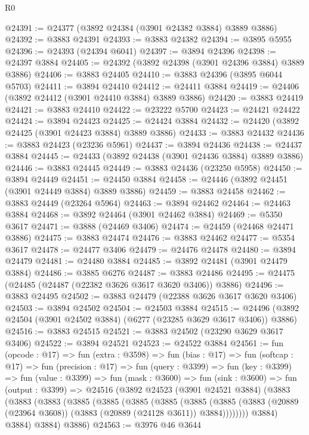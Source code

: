\begin{lexlean}{R0}
\begin{coremodule}
@24391 := @24377 (@3892 @24384 (@3901 @24382 @3884) @3889 @3886)
@24392 := @3883 @24391
@24393 := @3883 @24382
@24394 := @3895 @5955
@24396 := @24393 (@24394 @6041)
@24397 := @3894 @24396
@24398 := @24397 @3884
@24405 := @24392 (@3892 @24398 (@3901 @24396 @3884) @3889 @3886)
@24406 := @3883 @24405
@24410 := @3883 @24396 (@3895 @6044 @5703)
@24411 := @3894 @24410
@24412 := @24411 @3884
@24419 := @24406 (@3892 @24412 (@3901 @24410 @3884) @3889 @3886)
@24420 := @3883 @24419
@24421 := @3883 @24410
@24422 := @23222 @5700
@24423 := @24421 @24422
@24424 := @3894 @24423
@24425 := @24424 @3884
@24432 := @24420 (@3892 @24425 (@3901 @24423 @3884) @3889 @3886)
@24433 := @3883 @24432
@24436 := @3883 @24423 (@23236 @5961)
@24437 := @3894 @24436
@24438 := @24437 @3884
@24445 := @24433 (@3892 @24438 (@3901 @24436 @3884) @3889 @3886)
@24446 := @3883 @24445
@24449 := @3883 @24436 (@23250 @5958)
@24450 := @3894 @24449
@24451 := @24450 @3884
@24458 := @24446 (@3892 @24451 (@3901 @24449 @3884) @3889 @3886)
@24459 := @3883 @24458
@24462 := @3883 @24449 (@23264 @5964)
@24463 := @3894 @24462
@24464 := @24463 @3884
@24468 := @3892 @24464 (@3901 @24462 @3884)
@24469 := @5350 @3617
@24471 := @3888 (@24469 @3406)
@24474 := @24459 (@24468 @24471 @3886)
@24475 := @3883 @24474
@24476 := @3883 @24462
@24477 := @5354 @3617
@24478 := @24477 @3406
@24479 := @24476 @24478
@24480 := @3894 @24479
@24481 := @24480 @3884
@24485 := @3892 @24481 (@3901 @24479 @3884)
@24486 := @3885 @6276
@24487 := @3883 @24486
@24495 := @24475 (@24485 (@24487 (@22382 @3626 @3617 @3620 @3406)) @3886)
@24496 := @3883 @24495
@24502 := @3883 @24479 (@22388 @3626 @3617 @3620 @3406)
@24503 := @3894 @24502
@24504 := @24503 @3884
@24515 := @24496 (@3892 @24504 (@3901 @24502 @3884) (@6277 (@23285 @3629 @3617 @3406)) @3886)
@24516 := @3883 @24515
@24521 := @3883 @24502 (@23290 @3629 @3617 @3406)
@24522 := @3894 @24521
@24523 := @24522 @3884
@24561 := fun (opcode : @17) =>
  fun (extra : @3598) =>
  fun (bias : @17) =>
  fun (softcap : @17) =>
  fun (precision : @17) =>
  fun (query : @3399) =>
  fun (key : @3399) =>
  fun (value : @3399) =>
  fun (mask : @3600) =>
  fun (sink : @3600) =>
  fun (output : @3399) =>
  @24516
    (@3892
      @24523
      (@3901 @24521 @3884)
      (@3883
        (@3883
          (@3883
            (@3885
              (@3885
                (@3885
                  (@3885
                    (@3885
                      (@3885
                        (@3883 (@20889 (@23964 @3608)) (@3883 (@20889 (@24128 @3611)) @3884))))))))
            @3884)
          @3884)
        @3884)
      @3886)
@24563 := @3976 @46 @3644

\end{coremodule}
\end{lexlean}

